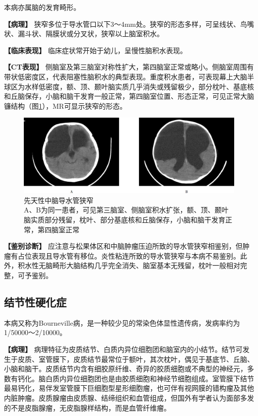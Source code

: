 本病亦属脑的发育畸形。

\textbf{【病理】}
狭窄多位于导水管口以下3～4mm处。狭窄的形态多样，可呈线状、鸟嘴状、漏斗状、隔膜状或分叉状，狭窄以上脑室积水。

\textbf{【临床表现】} 临床症状常开始于幼儿，呈慢性脑积水表现。

\textbf{【CT表现】}
侧脑室及第三脑室对称性扩大，第四脑室正常或略小。侧脑室周围有带状低密度区，代表阻塞性脑积水的典型表现。重度积水患者，可表现幕上大脑半球区为水样低密度，额、顶、颞叶脑实质几乎消失或残留极少，部分枕叶、基底核和丘脑保存，小脑和脑干发育一般正常，第四脑室位置、形态正常，可见正常大脑镰结构（图\ref{fig2-10}），MR可显示狭窄的形态。

\begin{figure}[!htbp]
 {\centering
 \includegraphics[width=.7\textwidth,height=\textheight,keepaspectratio]{./images/Image00026.jpg}
 \captionsetup{justification=centering}
 \caption{先天性中脑导水管狭窄\\{\small  A、B为同一患者，可见第三脑室、侧脑室积水扩张，额、顶、颞叶脑实质部分残留，枕叶、部分基底核和丘脑保存，小脑和脑干发育正常，第四脑室正常}}
 \label{fig2-10}}
  \end{figure} 



\textbf{【鉴别诊断】}
应注意与松果体区和中脑肿瘤压迫所致的导水管狭窄相鉴别，但肿瘤有占位表现且导水管有移位。炎性粘连所致的导水管狭窄与本病不易鉴别。此外，积水性无脑畸形大脑结构几乎完全消失、脑室基本无残留，枕叶一般相对完整，可予鉴别。

\subsection{结节性硬化症}

本病又称为Bourneville病，是一种较少见的常染色体显性遗传病，发病率约为1/50000～2/10000。

\textbf{【病理】}
病理特征为皮质结节、白质内异位细胞团和脑室内的小结节。结节可发生于皮质、室管膜下，皮质结节最常位于额叶，其次枕叶，偶见于基底节、丘脑、小脑和脑干。皮质结节内含有细胶原纤维、奇异的胶质细胞或不典型的神经元，多数有钙化。脑白质内异位细胞团也是由胶质细胞和神经节细胞组成。室管膜下结节最易钙化，易伴发室管膜下巨细胞型星形细胞瘤，也可伴有视网膜的错构瘤及其他内脏肿瘤。皮质腺瘤由皮质腺、结缔组织和血管组成，但国外有学者认为面部多发的不是皮脂腺瘤，无皮脂腺样结构，而是血管纤维瘤。

